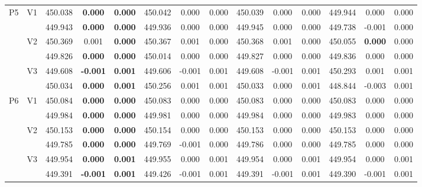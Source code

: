 \documentclass[12pt,a4paper]{article}
\begin{document}
\begin{sidewaystable}[ht]
{\begin{tabular}{cc|ccc|ccc|ccc|ccc|}
   \hline \hline\multirow{6}{*}{P5} & \multirow{2}{*}{V1} & 450.038 & \textbf{0.000} & \textbf{0.000} & 450.042 & 0.000 & 0.000 & 450.039 & 0.000 & 0.000 & 449.944 & 0.000 & 0.000 \\ 
   &  & 449.943 & \textbf{0.000} & \textbf{0.000} & 449.936 & 0.000 & 0.000 & 449.945 & 0.000 & 0.000 & 449.738 & -0.001 & 0.000 \\ 
   & \multirow{2}{*}{V2} & 450.369 & 0.001 & \textbf{0.000} & 450.367 & 0.001 & 0.000 & 450.368 & 0.001 & 0.000 & 450.055 & \textbf{0.000} & 0.000 \\ 
   &  & 449.826 & \textbf{0.000} & \textbf{0.000} & 450.014 & 0.000 & 0.000 & 449.827 & 0.000 & 0.000 & 449.836 & 0.000 & 0.000 \\ 
   & \multirow{2}{*}{V3} & 449.608 & \textbf{-0.001} & \textbf{0.001} & 449.606 & -0.001 & 0.001 & 449.608 & -0.001 & 0.001 & 450.293 & 0.001 & 0.001 \\ 
   &  & 450.034 & \textbf{0.000} & \textbf{0.001} & 450.256 & 0.001 & 0.001 & 450.033 & 0.000 & 0.001 & 448.844 & -0.003 & 0.001 \\ 
   \hline \hline\multirow{6}{*}{P6} & \multirow{2}{*}{V1} & 450.084 & \textbf{0.000} & \textbf{0.000} & 450.083 & 0.000 & 0.000 & 450.083 & 0.000 & 0.000 & 450.083 & 0.000 & 0.000 \\ 
   &  & 449.984 & \textbf{0.000} & \textbf{0.000} & 449.981 & 0.000 & 0.000 & 449.984 & 0.000 & 0.000 & 449.983 & 0.000 & 0.000 \\ 
   & \multirow{2}{*}{V2} & 450.153 & \textbf{0.000} & \textbf{0.000} & 450.154 & 0.000 & 0.000 & 450.153 & 0.000 & 0.000 & 450.153 & 0.000 & 0.000 \\ 
   &  & 449.785 & \textbf{0.000} & \textbf{0.000} & 449.769 & -0.001 & 0.000 & 449.786 & 0.000 & 0.000 & 449.785 & 0.000 & 0.000 \\ 
   & \multirow{2}{*}{V3} & 449.954 & \textbf{0.000} & \textbf{0.001} & 449.955 & 0.000 & 0.001 & 449.954 & 0.000 & 0.001 & 449.954 & 0.000 & 0.001 \\ 
   &  & 449.391 & \textbf{-0.001} & \textbf{0.001} & 449.426 & -0.001 & 0.001 & 449.391 & -0.001 & 0.001 & 449.390 & -0.001 & 0.001 \\ 
   \hline
\end{tabular}
}
\end{sidewaystable}
\end{document}
